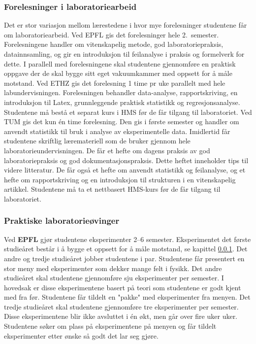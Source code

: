 \documentclass{article}
\begin{document}
\subsubsection{Forelesninger i laboratoriearbeid}\label{forel_lab}
Det er stor variasjon mellom lærestedene i hvor mye forelesninger studentene får om laboratoriearbeid.
Ved EPFL gis det forelesninger hele 2.~semester. Forelesningene handler om vitenskapelig metode, god laboratoriepraksis, datainnsamling, og gir en introduksjon til feilanalyse i praksis og formelverk for dette. I parallell med forelesningene skal studentene gjennomføre en praktisk oppgave der de skal bygge sitt eget vakuumkammer med oppsett for å måle motstand.
Ved ETHZ gis det forelesning 1 time pr uke parallelt med hele labundervisningen. Forelesningen behandler data-analyse, rapportskriving, en introduksjon til Latex, grunnleggende praktisk statistikk og regresjonsanalyse. Studentene må bestå et separat kurs i HMS før de får tilgang til laboratoriet.
Ved TUM gis det kun én time forelesning. Den gis i første semester og handler om anvendt statistikk til bruk i analyse av eksperimentelle data. Imidlertid får studentene skriftlig læremateriell som de bruker gjennom hele laboratorieundervisningen. De får et hefte om dagens praksis av god laboratoriepraksis og god dokumentasjonspraksis. Dette heftet inneholder tips til videre litteratur. De får også et hefte om anvendt statistikk og feilanalyse, og et hefte om rapportskriving og en introduksjon til strukturen i en vitenskapelig artikkel. Studentene må ta et nettbasert HMS-kurs før de får tilgang til laboratoriet.

\subsubsection{Praktiske laboratorieøvinger}
Ved \textbf{EPFL} gjør studentene eksperimenter 2--6 semester. Eksperimentet det første studieåret består i å bygge et oppsett for å måle motstand, se kapittel \ref{forel_lab}. Det andre og tredje studieåret jobber studentene i par. Studentene får presentert en stor meny med eksperimenter som dekker mange felt i fysikk. Det andre studieåret skal studentene gjennomføre sju eksperimenter per semester. I hovedsak er disse eksperimentene basert på teori som studentene er godt kjent med fra før. Studentene får tildelt en "pakke" med eksperimenter fra menyen. Det tredje studieåret skal studentene gjennomføre tre eksperimenter per semester. Disse eksperimentene blir ikke avsluttet i én økt, men går over fire uker uker. Studentene søker om plass på eksperimentene på menyen og får tildelt eksperimenter etter ønske så godt det lar seg gjøre.
\end{document}
